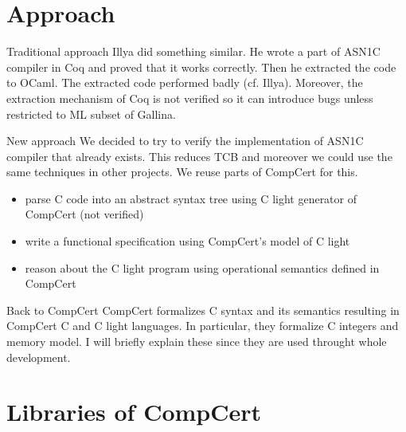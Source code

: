 \documentclass{beamer}
\begin{document}
\section{Approach}

\begin{frame}{Traditional approach}
  Illya did something similar. He wrote a part of ASN1C compiler in Coq and proved that it works correctly. Then he extracted the code to OCaml. The extracted code performed badly (cf. Illya). Moreover, the extraction mechanism of Coq is not verified so it can introduce bugs unless restricted to ML subset of Gallina.
\end{frame}

\begin{frame}{New approach}
  We decided to try to verify the implementation of ASN1C compiler that already exists. This reduces TCB and moreover we could use the same techniques in other projects. We reuse parts of CompCert for this.
\begin{itemize}
\item parse C code into an abstract syntax tree using C light generator of CompCert (not verified)
  \item write a functional specification using CompCert's model of C light 
\item reason about the C light program using operational semantics defined in CompCert
\end{itemize}
\end{frame}



  

\begin{frame}{Back to CompCert}
  CompCert formalizes C syntax and its semantics resulting in CompCert C and C light languages. In particular, they formalize C integers and memory model. I will briefly explain these since they are used throught whole development.
 \end{frame}
\section{Libraries of CompCert}
\end{document}
